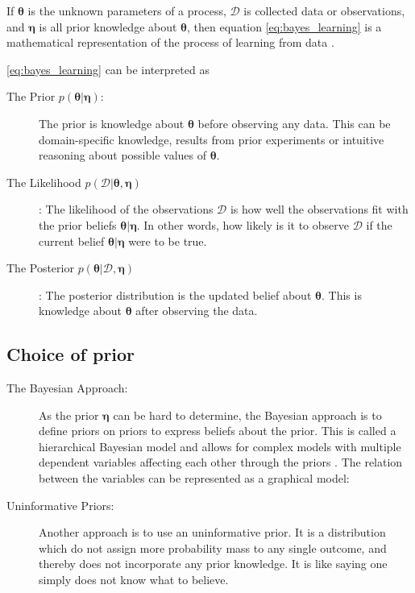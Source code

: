 If $\boldsymbol{\theta}$ is the unknown parameters of a process, $\mathcal{D}$ is collected data or observations, and $\boldsymbol{\eta}$ is all prior knowledge about $\boldsymbol{\theta}$, then equation \eqref{eq:bayes_learning} is a mathematical representation of the process of learning from data \cite{Jaynes86bayesianmethods:}.

\cref{eq:bayes_learning} can be interpreted as
\begin{description}
    \item[The Prior $p(\boldsymbol{\theta} | \boldsymbol{\eta})$:] The prior is knowledge about $\boldsymbol{\theta}$ before observing any data. This can be domain-specific knowledge, results from prior experiments or intuitive reasoning about possible values of $\boldsymbol{\theta}$. 
    \item[The Likelihood $p(\mathcal{D} | \boldsymbol{\theta}, \boldsymbol{\eta})$]: The likelihood of the observations $\mathcal{D}$ is how well the observations fit with the prior beliefs $\boldsymbol{\theta} | \boldsymbol{\eta}$. In other words, how likely is it to observe $\mathcal{D}$ if the current belief $\boldsymbol{\theta} | \boldsymbol{\eta}$ were to be true.
    \item[The Posterior $p(\boldsymbol{\theta} | \mathcal{D}, \boldsymbol{\eta})$]: The posterior distribution is the updated belief about $\boldsymbol{\theta}$. This is knowledge about $\boldsymbol{\theta}$ after observing the data. 
\end{description}

\subsection{Choice of prior}

\begin{description}
\item[The Bayesian Approach:]As the prior $\boldsymbol{\eta}$ can be hard to determine, the Bayesian approach is to define priors on priors to express beliefs about the prior. This is called a hierarchical Bayesian model and allows for complex models with multiple dependent variables affecting each other through the priors \cite{murphy}. The relation between the variables can be represented as a graphical model:

\begin{figure*}[h!]
\centering    
{}
\end{figure*}

\item[Uninformative Priors:]Another approach is to use an uninformative prior. It is a distribution which do not assign more probability mass to any single outcome, and thereby does not incorporate any prior knowledge. It is like saying one simply does not know what to believe.
\end{description}


